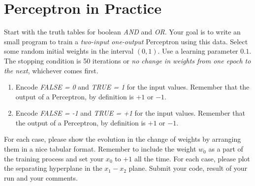 \documentclass[12pt]{article}
\numberwithin{equation}{section}
\numberwithin{table}{section}
\numberwithin{figure}{section}
\begin{document}
\section{Perceptron in Practice}
Start with the truth tables for boolean \textit{AND} and \textit{OR}. Your goal is to write an small program to train a \textit{two-input one-output} Perceptron using this data. Select some random initial weights in the interval $(0, 1)$. Use a learning parameter $0.1$. The stopping condition is 50 iterations or \textit{no change in weights from one epoch to the next}, whichever comes first.
\begin{enumerate}[label=(\alph*)]
	\item Encode \textit{FALSE = 0} and \textit{TRUE = 1} for the input values. Remember that the output of a Perceptron, by definition is $+1$ or $-1$.
	\item Encode \textit{FALSE = -1} and \textit{TRUE = +1} for the input values. Remember that the output of a Perceptron, by definition is $+1$ or $-1$.
\end{enumerate}
For each case, please show the evolution in the change of weights by arranging them in a nice tabular format. Remember to include the weight $w_0$ as a part of the training process and set your $x_0$ to $+1$ all the time. For each case, please plot the separating hyperplane in the $x_1-x_2$ plane. Submit your code, result of your run and your comments.
\end{document}
